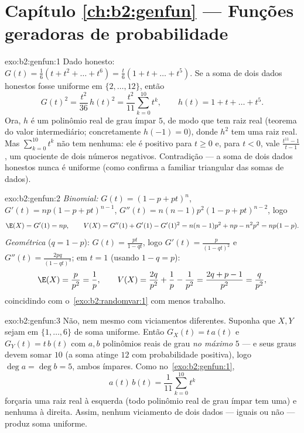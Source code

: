 \section*{Capítulo \ref{ch:b2:genfun} --- Funções geradoras de probabilidade}

\begin{solution}{exo:b2:genfun:1}
Dado honesto: $G(t) = \frac16(t + t^2 + \dots + t^6) = \frac t6(1 + t
+ \dots + t^5)$. Se a soma de dois dados honestos fosse uniforme em
$\{2, \dots, 12\}$, então
\[
G(t)^2 = \frac{t^2}{36}\,h(t)^2
= \frac{t^2}{11}\sum_{k=0}^{10}t^k ,
\qquad h(t) = 1 + t + \dots + t^5 .
\]
Ora, $h$ é um polinômio real de grau ímpar $5$, de modo que tem raiz
real (teorema do valor intermediário; concretamente $h(-1) = 0$), donde
$h^2$ tem uma raiz real. Mas $\sum_{k=0}^{10}t^k$ não tem nenhuma: ele é
positivo para $t \geq 0$ e, para $t < 0$, vale
$\frac{t^{11} - 1}{t - 1}$, um quociente de dois números negativos.
Contradição --- a soma de dois dados honestos nunca é uniforme (como
confirma a familiar  triangular das somas de dados).
\end{solution}

\begin{solution}{exo:b2:genfun:2}
\emph{Binomial:} $G(t) = (1 - p + pt)^n$, $G'(t) = np(1 - p +
pt)^{n-1}$, $G''(t) = n(n-1)p^2(1 - p + pt)^{n-2}$, logo
\[
\E(X) = G'(1) = np,
\qquad
V(X) = G''(1) + G'(1) - G'(1)^2
= n(n-1)p^2 + np - n^2p^2 = np(1-p).
\]
\emph{Geométrica} ($q = 1 - p$): $G(t) = \frac{pt}{1 - qt}$, logo
$G'(t) = \frac{p}{(1 - qt)^2}$ e $G''(t) = \frac{2pq}{(1 -
qt)^3}$; em $t = 1$ (usando $1 - q = p$):
\[
\E(X) = \frac{p}{p^2} = \frac1p,
\qquad
V(X) = \frac{2q}{p^2} + \frac1p - \frac{1}{p^2}
= \frac{2q + p - 1}{p^2}
= \frac{q}{p^2} ,
\]
coincidindo com o~\cref{exo:b2:randomvar:1} com menos trabalho.
\end{solution}

\begin{solution}{exo:b2:genfun:3}
Não, nem mesmo com viciamentos diferentes. Suponha que $X, Y$ sejam  em
$\{1, \dots, 6\}$ de soma uniforme. Então $G_X(t) = t\,a(t)$ e
$G_Y(t) = t\,b(t)$ com $a, b$ polinômios reais de grau \emph{no
máximo} $5$ --- e seus graus devem somar $10$ (a soma atinge
$12$ com probabilidade positiva), logo $\deg a = \deg b = 5$, ambos
ímpares. Como no~\cref{exo:b2:genfun:1},
\[
a(t)\,b(t) = \frac{1}{11}\sum_{k=0}^{10}t^k
\]
forçaria uma raiz real à esquerda (todo polinômio real de grau
ímpar tem uma) e nenhuma à direita. Assim, nenhum viciamento de dois
dados  --- iguais ou não --- produz soma uniforme.
\end{solution}

